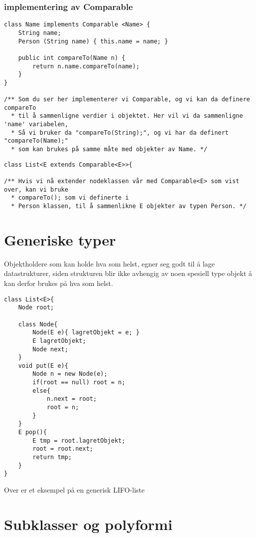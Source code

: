 \documentclass[a4paper,norsk,10pt]{article}
\begin{document}
\subsubsection{implementering av Comparable}
\label{sec-17.2}

\begin{verbatim}
class Name implements Comparable <Name> {
    String name;
    Person (String name) { this.name = name; }

    public int compareTo(Name n) {
        return n.name.compareTo(name);
    }
}

/** Som du ser her implementerer vi Comparable, og vi kan da definere compareTo 
  * til å sammenligne verdier i objektet. Her vil vi da sammenligne 'name' variabelen, 
  * Så vi bruker da "compareTo(String);", og vi har da definert "compareTo(Name);" 
  * som kan brukes på samme måte med objekter av Name. */
\end{verbatim}
\begin{verbatim}
class List<E extends Comparable<E>>{

/** Hvis vi nå extender nodeklassen vår med Comparable<E> som vist over, kan vi bruke 
  * compareTo(); som vi definerte i 
  * Person klassen, til å sammenlikne E objekter av typen Person. */
\end{verbatim}
\section{Generiske typer}
\label{sec-17}

Objektholdere som kan holde hva som helst, egner seg godt til å lage datastrukturer, siden strukturen blir ikke avhengig av noen spesiell type objekt å
kan derfor brukes på hva som helst. 

\begin{verbatim}
class List<E>{
    Node root;
    
    class Node{
        Node(E e){ lagretObjekt = e; } 
        E lagretObjekt;
        Node next;
    }    
    void put(E e){
        Node n = new Node(e);
        if(root == null) root = n;
        else{ 
            n.next = root; 
            root = n;
        }
    }    
    E pop(){
        E tmp = root.lagretObjekt;
        root = root.next;
        return tmp;
    }
}
\end{verbatim}

Over er et eksempel på en generisk LIFO-liste
\section{Subklasser og polyformi}
\label{sec-18}
\end{document}

